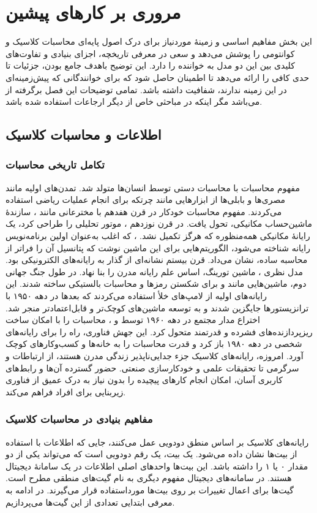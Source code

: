 \chapter{مروری بر کارهای پیشین}
این بخش مفاهیم اساسی و زمینهٔ موردنیاز برای درک اصول پایه‌ای محاسبات کلاسیک و کوانتومی را پوشش می‌دهد و سعی در معرفی تاریخچه، اجزای بنیادی و تفاوت‌های کلیدی بین این دو مدل به خواننده را دارد. این توضیح باهدف جامع بودن، جزئیات تا حدی کافی را ارائه می‌دهد تا اطمینان حاصل شود که برای خوانندگانی که پیش‌زمینه‌ای در این زمینه ندارند، شفافیت داشته باشد. تمامی توضیحات این فصل برگرفته از \cite{wong_introduction_2022} می‌باشد مگر اینکه در مباحثی خاص از دیگر ارجاعات استفاده شده باشد.
\section{اطلاعات و محاسبات کلاسیک}
\subsection{تکامل تاریخی محاسبات}
مفهوم محاسبات با محاسبات دستی توسط انسان‌ها متولد شد. تمدن‌های اولیه مانند مصری‌ها و بابلی‌ها از ابزارهایی مانند چرتکه برای انجام عملیات ریاضی استفاده می‌کردند. مفهوم محاسبات خودکار در قرن هفدهم با مخترعانی مانند
،
سازندهٔ ماشین‌حساب مکانیکی، تحول یافت. در قرن نوزدهم
،
موتور تحلیلی را طراحی کرد، یک رایانهٔ مکانیکی همه‌منظوره که هرگز تکمیل نشد.
،
که اغلب به‌عنوان اولین برنامه‌نویس رایانه شناخته می‌شود، الگوریتم‌هایی برای این ماشین نوشت که پتانسیل آن را فراتر از محاسبه ساده، نشان می‌داد.
قرن بیستم نشانه‌ای از گذار به رایانه‌های الکترونیکی بود. مدل نظری
،
ماشین تورینگ، اساس علم رایانه مدرن را بنا نهاد. در طول جنگ جهانی دوم، ماشین‌هایی مانند
و
برای شکستن رمزها و محاسبات بالستیکی ساخته شدند. این رایانه‌های اولیه از لامپ‌های خلأ استفاده می‌کردند که بعدها در دهه ۱۹۵۰ با ترانزیستورها جایگزین شدند و به توسعه ماشین‌های کوچک‌تر و قابل‌اعتمادتر منجر شد.
اختراع مدار مجتمع در دهه ۱۹۶۰ توسط
و
،
محاسبات را با امکان ساخت ریزپردازنده‌های فشرده و قدرتمند متحول کرد. این جهش فناوری، راه را برای رایانه‌های شخصی در دهه ۱۹۸۰ باز کرد و قدرت محاسبات را به خانه‌ها و کسب‌وکارهای کوچک آورد. امروزه، رایانه‌های کلاسیک جزء جدایی‌ناپذیر زندگی مدرن هستند، از ارتباطات و سرگرمی تا تحقیقات علمی و خودکارسازی صنعتی. حضور گسترده آن‌ها و رابط‌های کاربری آسان، امکان انجام کارهای پیچیده را بدون نیاز به درک عمیق از فناوری زیربنایی برای افراد فراهم می‌کند.

\subsection{مفاهیم بنیادی در محاسبات کلاسیک}
رایانه‌های کلاسیک بر اساس منطق دودویی عمل می‌کنند، جایی که اطلاعات با استفاده از بیت‌ها نشان داده می‌شود. یک بیت، یک رقم دودویی است که می‌تواند یکی از دو مقدار ۰ یا ۱ را داشته باشد. این بیت‌ها واحدهای اصلی اطلاعات در یک سامانهٔ دیجیتال هستند. در سامانه‌های دیجیتال مفهوم دیگری به نام گیت‌های منطقی مطرح است. گیت‌ها برای اعمال تغییرات بر روی بیت‌ها مورداستفاده قرار می‌گیرند. در ادامه به معرفی ابتدایی تعدادی از این گیت‌ها می‌پردازیم.

